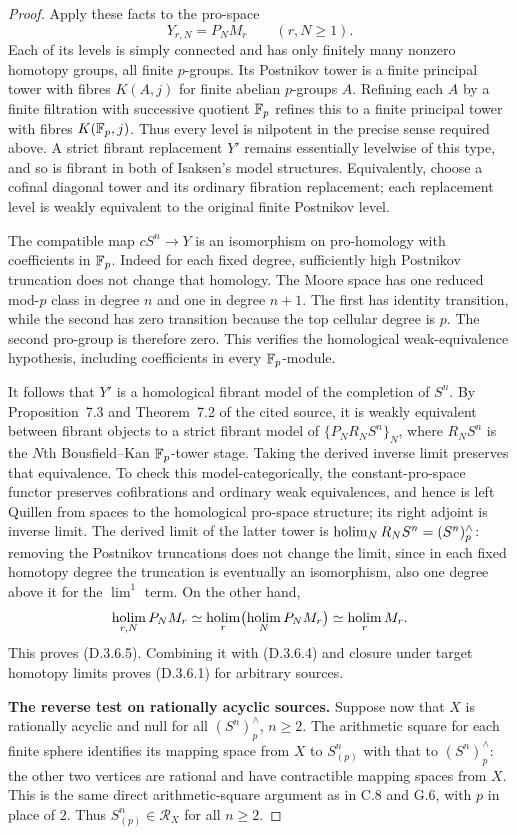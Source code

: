 \begin{proof}
Apply these facts to the pro-space
\[
                    Y_{r,N}=P_NM_r\qquad(r,N\geq1).
\]
Each of its levels is simply connected and has only
finitely many nonzero homotopy groups, all finite
$p$-groups. Its Postnikov tower is a finite principal
tower with fibres $K(A,j)$ for finite abelian $p$-groups
$A$. Refining each $A$ by a finite filtration with
successive quotient $\mathbb F_p$ refines this to a finite
principal tower with fibres $K(\mathbb F_p,j)$. Thus every level
is nilpotent in the precise sense required above.
A strict fibrant replacement $Y'$ remains essentially
levelwise of this type, and so is fibrant in both of
Isaksen's model structures. Equivalently, choose a
cofinal diagonal tower and its ordinary fibration
replacement; each replacement level is weakly equivalent
to the original finite Postnikov level.

The compatible map $cS^n\to Y$ is an isomorphism on
pro-homology with coefficients in $\mathbb F_p$. Indeed for
each fixed degree, sufficiently high Postnikov truncation
does not change that homology. The Moore space has one
reduced mod-$p$ class in degree $n$ and one in degree
$n+1$. The first has identity transition, while the second
has zero transition because the top cellular degree is $p$.
The second pro-group is therefore zero. This verifies the
homological weak-equivalence hypothesis, including
coefficients in every $\mathbb F_p$-module.

It follows that $Y'$ is a homological fibrant model of the
completion of $S^n$. By Proposition~7.3 and Theorem~7.2
of the cited source, it is weakly equivalent between
fibrant objects to a strict fibrant model of
$\{P_NR_NS^n\}_N$, where $R_NS^n$ is the $N$th
Bousfield--Kan $\mathbb F_p$-tower stage.
Taking the derived inverse limit preserves that
equivalence. To check this model-categorically, the
constant-pro-space functor preserves cofibrations and
ordinary weak equivalences, and hence is left Quillen
from spaces to the homological pro-space structure;
its right adjoint is inverse limit.
The derived limit of the latter tower is
$\operatorname*{holim}_NR_NS^n=(S^n)^{\wedge}_p$: removing the
Postnikov truncations does not change the limit, since
in each fixed homotopy degree the truncation is eventually
an isomorphism, also one degree above it for the
$\lim^1$ term.
On the other hand,
\[
 \operatorname*{holim}_{r,N}P_NM_r
       \simeq\operatorname*{holim}_r\bigl(\operatorname*{holim}_NP_NM_r\bigr)
       \simeq\operatorname*{holim}_rM_r.
 \]
This proves (D.3.6.5). Combining it with (D.3.6.4) and
closure under target homotopy limits proves (D.3.6.1)
for arbitrary sources.

\medskip\noindent
\textbf{The reverse test on rationally acyclic sources.}
Suppose now that $X$ is rationally acyclic and null for
all $(S^n)^{\wedge}_p$, $n\geq2$. The arithmetic square
for each finite sphere identifies its mapping space
from $X$ to $S^n_{(p)}$ with that to $(S^n)^{\wedge}_p$:
the other two vertices are rational and have contractible
mapping spaces from $X$. This is the same direct
arithmetic-square argument as in C.8 and G.6, with $p$
in place of $2$. Thus $S^n_{(p)}\in\mathcal R_X$ for
all $n\geq2$.


\end{proof}
